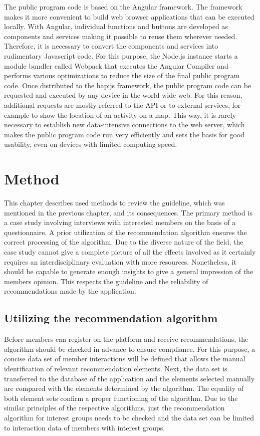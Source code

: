 \documentclass[12pt,numbers=noenddot,parskip,bibliography=totocnumbered,listof=totocnumbered,draft]{scrreprt}
\begin{document}
The public program code is based on the Angular \citep{angular} framework. The framework makes it more convenient to build web browser applications that can be executed locally. With Angular, individual functions and buttons are developed as components and services making it possible to reuse them wherever needed. Therefore, it is necessary to convert the components and services into rudimentary Javascript code. For this purpose, the Node.js instance starts a module bundler called Webpack \citep{webpack} that executes the Angular Compiler and performs various optimizations to reduce the size of the final public program code. Once distributed to the hapijs framework, the public program code can be requested and executed by any device in the world wide web. For this reason, additional requests are mostly referred to the API or to external services, for example to show the location of an activity on a map. This way, it is rarely necessary to establish new data-intensive connections to the web server, which makes the public program code run very efficiently and sets the basis for good usability, even on devices with limited computing speed.

\chapter{Method}
This chapter describes used methods to review the guideline, which was mentioned in the previous chapter, and its consequences. The primary method is a case study involving interviews with interested members on the basis of a questionnaire. A prior utilization of the recommendation algorithm ensures the correct processing of the algorithm. Due to the diverse nature of the field, the case study cannot give a complete picture of all the effects involved as it certainly requires an interdisciplinary evaluation with more resources. Nonetheless, it should be capable to generate enough insights to give a general impression of the members opinion. This respects the guideline and the reliability of recommendations made by the application.

\section{Utilizing the recommendation algorithm}
Before members can register on the platform and receive recommendations, the algorithm should be checked in advance to ensure compliance. For this purpose, a concise data set of member interactions will be defined that allows the manual identification of relevant recommendation elements. Next, the data set is transferred to the database of the application and the elements selected manually are compared with the elements determined by the algorithm. The equality of both element sets confirm a proper functioning of the algorithm. Due to the similar principles of the respective algorithms, just the recommendation algorithm for interest groups needs to be checked and the data set can be limited to interaction data of members with interest groups.
\end{document}
